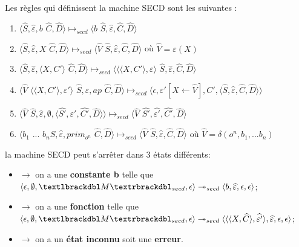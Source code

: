 \documentclass[10pt,a4paper]{article}
\begin{document}
				Les règles qui définissent la machine SECD sont les suivantes :
				\smallbreak
				\begin{enumerate}
					\item $\langle\widehat{S},\widehat{\varepsilon},b$ $\widehat{C},\widehat{D}\rangle \longmapsto_{secd} \langle b$ $\widehat{S},\widehat{\varepsilon},\widehat{C},\widehat{D}\rangle$
					\item $\langle\widehat{S},\widehat{\varepsilon},X$ $\widehat{C},\widehat{D}\rangle \longmapsto_{secd} \langle \widehat{V}$ $\widehat{S},\widehat{\varepsilon},\widehat{C},\widehat{D}\rangle$ où $\widehat{V} = \varepsilon(X)$
					\item $\langle\widehat{S},\widehat{\varepsilon},\langle X,C'\rangle$ $\widehat{C},\widehat{D}\rangle \longmapsto_{secd} \langle\langle\langle X,C'\rangle,\varepsilon\rangle$ $\widehat{S},\widehat{\varepsilon},\widehat{C},\widehat{D}\rangle$
					\item $\langle\widehat{V}$ $\langle\langle X,C'\rangle,\varepsilon'\rangle$ $\widehat{S},\widehat{\varepsilon},ap$ $\widehat{C},\widehat{D}\rangle \longmapsto_{secd} \langle\epsilon,\varepsilon'[X \leftarrow \widehat{V}],C',\langle\widehat{S},\widehat{\varepsilon},\widehat{C},\widehat{D}\rangle\rangle$
					\item $\langle\widehat{V}$ $\widehat{S},\widehat{\varepsilon},\emptyset,\langle\widehat{S'},\widehat{\varepsilon'},\widehat{C'},\widehat{D}\rangle\rangle \longmapsto_{secd} \langle \widehat{V}$ $\widehat{S'},\widehat{\varepsilon'},\widehat{C'},\widehat{D}\rangle$
					\item $\langle b_{1}$ $...$ $b_{n}\widehat{S},\widehat{\varepsilon},prim_{o^{n}}$ $\widehat{C},\widehat{D}\rangle \longmapsto_{secd} \langle \widehat{V}$ $\widehat{S},\widehat{\varepsilon},\widehat{C},\widehat{D}\rangle$ où $\widehat{V} = \delta(o^{n},b_1,...b_{n})$
				\end{enumerate}
				\bigbreak
				
				
				la machine SECD peut s'arrêter dans 3 états différents:
				\begin{itemize}
					\item[]$\longrightarrow$ on a une \textbf{constante b} telle que $\langle \epsilon,\emptyset,\textlbrackdbl M\textrbrackdbl_{secd},\epsilon\rangle \twoheadrightarrow_{secd} \langle b,\widehat{\varepsilon},\epsilon,\epsilon\rangle$;
					\item[]$\longrightarrow$ on a une \textbf{fonction} telle que $\langle \epsilon,\emptyset,\textlbrackdbl M\textrbrackdbl_{secd},\epsilon\rangle \twoheadrightarrow_{secd} \langle\langle\langle X,\widehat{C}\rangle,\widehat{\varepsilon'}\rangle,\widehat{\varepsilon},\epsilon,\epsilon\rangle$;
					\item[]$\longrightarrow$ on a un \textbf{état inconnu} soit une \textbf{erreur}.
				\end{itemize}
				\bigbreak
				
\end{document}
